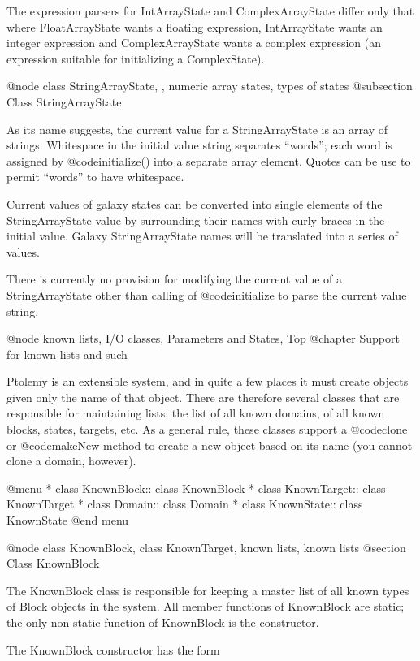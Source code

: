 The expression parsers for IntArrayState and ComplexArrayState differ
only that where FloatArrayState wants a floating expression,
IntArrayState wants an integer expression and ComplexArrayState
wants a complex expression (an expression suitable for initializing
a ComplexState).

@node class StringArrayState,  , numeric array states, types of states
@subsection Class StringArrayState

As its name suggests, the current value for a StringArrayState is
an array of strings.  Whitespace in the initial value string separates
``words''; each word is assigned by @code{initialize()} into a
separate array element.  Quotes can be use to permit ``words''
to have whitespace.

Current values of galaxy states can be converted into single elements
of the StringArrayState value by surrounding their names with curly
braces in the initial value.  Galaxy StringArrayState names will
be translated into a series of values.

There is currently no provision for modifying the current value of
a StringArrayState other than calling of @code{initialize} to parse
the current value string.

@node known lists, I/O classes, Parameters and States, Top
@chapter Support for known lists and such

Ptolemy is an extensible system, and in quite a few places it must
create objects given only the name of that object.  There are therefore
several classes that are responsible for maintaining lists: the list of
all known domains, of all known blocks, states, targets, etc.  As a
general rule, these classes support a @code{clone} or @code{makeNew}
method to create a new object based on its name (you cannot clone a
domain, however).

@menu
* class KnownBlock::            class KnownBlock
* class KnownTarget::           class KnownTarget
* class Domain::                class Domain
* class KnownState::            class KnownState
@end menu

@node class KnownBlock, class KnownTarget, known lists, known lists
@section Class KnownBlock

The KnownBlock class is responsible for keeping a master list of all
known types of Block objects in the system.  All member functions of
KnownBlock are static; the only non-static function of KnownBlock is
the constructor.

The KnownBlock constructor has the form

